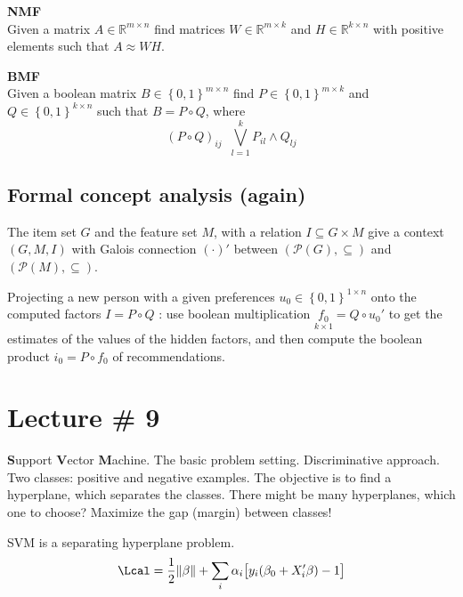 \documentclass[a4paper]{article}
\newcommand{\obj}[1]{{\left\{ #1 \right \}}}
\newcommand{\nrm}[1]{{\left\| #1 \right \|}}
\newcommand{\Real}{\mathbb{R}}
\newcommand{\defn}{\mathop{\overset{\Delta}{=}}\nolimits}
\begin{document}
\noindent\textbf{NMF}\hfill \\
Given a matrix $A\in \Real^{m\times n}$ find matrices $W\in \Real^{m\times k}$ and
$H\in \Real^{k\times n}$ with positive elements such that $A\approx W H$.

\noindent\textbf{BMF}\hfill \\
Given a boolean matrix $B\in \obj{0,1}^{m\times n}$ find $P\in \obj{0,1}^{m\times k}$ and
$Q\in \obj{0,1}^{k\times n}$ such that $B = P\circ Q$, where 
\[(P \circ Q)_{ij} \defn \bigvee_{l=1}^k P_{il}\wedge Q_{lj} \]


\subsection{Formal concept analysis (again)} %
\label{sub:formal_concept_analysis}

The item set $G$ and the feature set $M$, with a relation $I\subseteq G\times M$
give a context $(G,M,I)$ with Galois connection $(\cdot)'$ between $(\mathcal{P}(G),\subseteq)$ and $(\mathcal{P}(M),\subseteq)$.



Projecting a new person with a given preferences $u_0\in \obj{0,1}^{1\times n}$ onto the computed factors $I=P\circ Q$ : 
use boolean multiplication $\underset{k\times 1}{f_0} = Q \circ u_0'$ to get the estimates of the values of the hidden
factors, and then compute the boolean product $i_0 = P\circ f_0$ of recommendations.




\section{Lecture \# 9} %
\label{sec:lecture_9}

\textbf{S}upport \textbf{V}ector \textbf{M}achine.
The basic problem setting. Discriminative approach.
Two classes: positive and negative examples. The objective is to find a hyperplane, which separates the classes.
There might be many hyperplanes, which one to choose? Maximize the gap (margin) between classes!

SVM is a separating hyperplane problem.
\[\Lcal = \frac{1}{2}\nrm{\beta} + \sum_i \alpha_i \big[y_i(\beta_0 + X_i'\beta) - 1\big]\]
\end{document}
